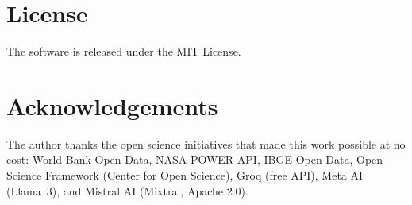 \documentclass[12pt,a4paper]{article}
\begin{document}
\section*{License}

The software is released under the MIT License.

\section*{Acknowledgements}

The author thanks the open science initiatives that made this work possible at
no cost: World Bank Open Data, NASA POWER API, IBGE Open Data, Open Science
Framework (Center for Open Science), Groq (free API), Meta AI (Llama~3), and
Mistral AI (Mixtral, Apache 2.0).

\printbibliography[title={References}]
\end{document}
